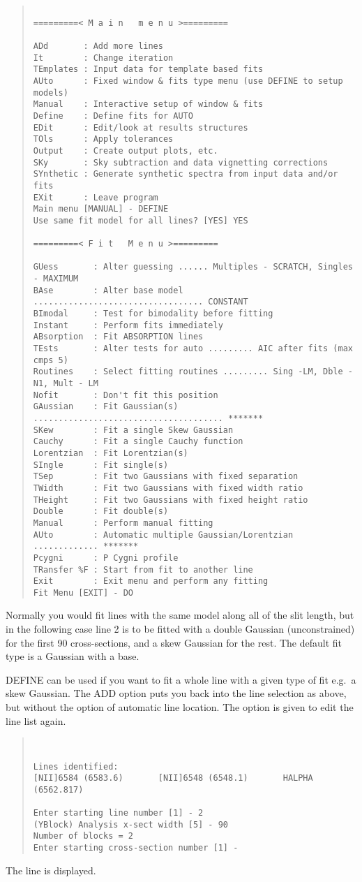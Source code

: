 \begin{quote}\begin{verbatim}
 
=========< M a i n   m e n u >=========
 
ADd       : Add more lines
It        : Change iteration
TEmplates : Input data for template based fits
AUto      : Fixed window & fits type menu (use DEFINE to setup models)
Manual    : Interactive setup of window & fits
Define    : Define fits for AUTO
EDit      : Edit/look at results structures
TOls      : Apply tolerances
Output    : Create output plots, etc.
SKy       : Sky subtraction and data vignetting corrections
SYnthetic : Generate synthetic spectra from input data and/or fits
EXit      : Leave program
Main menu [MANUAL] - DEFINE
Use same fit model for all lines? [YES] YES

=========< F i t   M e n u >=========

GUess       : Alter guessing ...... Multiples - SCRATCH, Singles - MAXIMUM
BAse        : Alter base model .................................. CONSTANT
BImodal     : Test for bimodality before fitting
Instant     : Perform fits immediately
ABsorption  : Fit ABSORPTION lines
TEsts       : Alter tests for auto ......... AIC after fits (max cmps 5)
Routines    : Select fitting routines ......... Sing -LM, Dble - N1, Mult - LM
Nofit       : Don't fit this position
GAussian    : Fit Gaussian(s) ...................................... *******
SKew        : Fit a single Skew Gaussian
Cauchy      : Fit a single Cauchy function
Lorentzian  : Fit Lorentzian(s)
SIngle      : Fit single(s)
TSep        : Fit two Gaussians with fixed separation
TWidth      : Fit two Gaussians with fixed width ratio
THeight     : Fit two Gaussians with fixed height ratio
Double      : Fit double(s)
Manual      : Perform manual fitting
AUto        : Automatic multiple Gaussian/Lorentzian ............. *******
Pcygni      : P Cygni profile
TRansfer %F : Start from fit to another line
Exit        : Exit menu and perform any fitting
Fit Menu [EXIT] - DO
\end{verbatim}\end{quote}
Normally you would fit lines with the same model along all of
the slit length, but in the following case line 2 is to be fitted with a
double Gaussian (unconstrained) for the first 90 cross-sections, and a
skew Gaussian for the rest.
The default fit type is a Gaussian with a base.

DEFINE can be used if you want to fit a whole line with a given type of
fit e.g.\ a skew Gaussian.
The ADD option puts you back into the line selection as above, but
without the option of automatic line location.
The option is given to edit the line list again.
\begin{quote}\begin{verbatim}
 
 
Lines identified:
[NII]6584 (6583.6)       [NII]6548 (6548.1)       HALPHA (6562.817)
 
Enter starting line number [1] - 2
(YBlock) Analysis x-sect width [5] - 90
Number of blocks = 2
Enter starting cross-section number [1] -
\end{verbatim}\end{quote}
The line is displayed.

